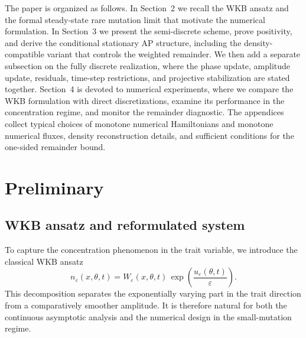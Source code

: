 \documentclass[11pt]{article}
\begin{document}
The paper is organized as follows. In Section~2 we recall the WKB ansatz and the formal steady-state rare mutation limit that motivate the numerical formulation. In Section~3 we present the semi-discrete scheme, prove positivity, and derive the conditional stationary AP structure, including the density-compatible variant that controls the weighted remainder. {\color{red} We then add a separate subsection on the fully discrete realization, where the phase update, amplitude update, residuals, time-step restrictions, and projective stabilization are stated together.} Section~4 is devoted to numerical experiments, where we compare the WKB formulation with direct discretizations, examine its performance in the concentration regime, and monitor the remainder diagnostic. The appendices collect typical choices of monotone numerical Hamiltonians and monotone numerical fluxes, density reconstruction details, and sufficient conditions for the one-sided remainder bound.


\section{Preliminary}

\subsection{WKB ansatz and reformulated system}

To capture the concentration phenomenon in the trait variable, we introduce the classical WKB ansatz
\begin{equation}\label{eq:WKB}
   n_\varepsilon(x,\theta,t)
   = W_\varepsilon(x,\theta,t)\,
   \exp\!\left(\frac{u_\varepsilon(\theta,t)}{\varepsilon}\right).
\end{equation}
This decomposition separates the exponentially varying part in the trait direction from a comparatively smoother amplitude. It is therefore natural for both the continuous asymptotic analysis and the numerical design in the small-mutation regime.
\end{document}
